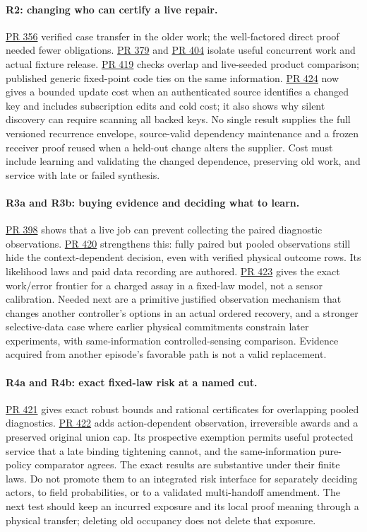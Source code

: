 \documentclass[11pt]{article}
\newcommand{\pr}[1]{\href{https://github.com/eternal-november/eos-research-programmes/pull/#1}{PR #1}}
\begin{document}
\paragraph{R2: changing who can certify a live repair.}
\pr{356} verified case transfer in the older work; the well-factored direct proof needed fewer obligations. \pr{379} and \pr{404} isolate useful concurrent work and actual fixture release. \pr{419} checks overlap and live-seeded product comparison; published generic fixed-point code ties on the same information. \pr{424} now gives a bounded update cost when an authenticated source identifies a changed key and includes subscription edits and cold cost; it also shows why silent discovery can require scanning all backed keys. No single result supplies the full versioned recurrence envelope, source-valid dependency maintenance and a frozen receiver proof reused when a held-out change alters the supplier. Cost must include learning and validating the changed dependence, preserving old work, and service with late or failed synthesis.

\paragraph{R3a and R3b: buying evidence and deciding what to learn.}
\pr{398} shows that a live job can prevent collecting the paired diagnostic observations. \pr{420} strengthens this: fully paired but pooled observations still hide the context-dependent decision, even with verified physical outcome rows. Its likelihood laws and paid data recording are authored. \pr{423} gives the exact work/error frontier for a charged assay in a fixed-law model, not a sensor calibration. Needed next are a primitive justified observation mechanism that changes another controller's options in an actual ordered recovery, and a stronger selective-data case where earlier physical commitments constrain later experiments, with same-information controlled-sensing comparison. Evidence acquired from another episode's favorable path is not a valid replacement.

\paragraph{R4a and R4b: exact fixed-law risk at a named cut.}
\pr{421} gives exact robust bounds and rational certificates for overlapping pooled diagnostics. \pr{422} adds action-dependent observation, irreversible awards and a preserved original union cap. Its prospective exemption permits useful protected service that a late binding tightening cannot, and the same-information pure-policy comparator agrees. The exact results are substantive under their finite laws. Do not promote them to an integrated risk interface for separately deciding actors, to field probabilities, or to a validated multi-handoff amendment. The next test should keep an incurred exposure and its local proof meaning through a physical transfer; deleting old occupancy does not delete that exposure.
\end{document}
